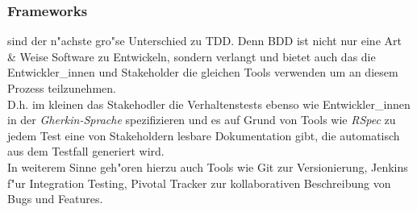     \subsubsection{Frameworks} sind der n"achste gro"se Unterschied zu TDD. Denn 
      BDD ist nicht nur eine Art \& Weise Software zu Entwickeln, sondern verlangt
      und bietet auch das die Entwickler\_innen und Stakeholder die gleichen
      Tools verwenden um an diesem Prozess teilzunehmen.\\
      D.h. im kleinen das Stakehodler die Verhaltenstests ebenso wie 
      Entwickler\_innen in der {\em Gherkin-Sprache } spezifizieren und es 
      auf Grund von Tools wie {\em RSpec } zu jedem Test eine von Stakeholdern
      lesbare Dokumentation gibt, die automatisch aus dem Testfall generiert wird.\\
      In weiterem Sinne geh"oren hierzu auch Tools wie Git zur Versionierung, 
      Jenkins f"ur Integration Testing, Pivotal Tracker zur kollaborativen 
      Beschreibung von Bugs und Features. 

